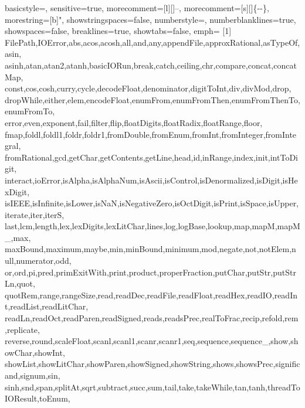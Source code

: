 \renewcommand{\ttdefault}{pcr}
 {
        basicstyle=\itfamily\small,
        sensitive=true,
        morecomment=[l][\ttfamily\tiny]{--},
        morecomment=[s][\ttfamily\tiny]{\{-}{-\}},
        morestring=[b]",
        showstringspaces=false,
        numberstyle=\tiny,
        numberblanklines=true,
        showspaces=false,
        breaklines=true,
        showtabs=false,
        emph=
        {[1]
                        FilePath,IOError,abs,acos,acosh,all,and,any,appendFile,approxRational,asTypeOf,asin,
                asinh,atan,atan2,atanh,basicIORun,break,catch,ceiling,chr,compare,concat,concatMap,
                const,cos,cosh,curry,cycle,decodeFloat,denominator,digitToInt,div,divMod,drop,
                dropWhile,either,elem,encodeFloat,enumFrom,enumFromThen,enumFromThenTo,enumFromTo,
                error,even,exponent,fail,filter,flip,floatDigits,floatRadix,floatRange,floor,
                fmap,foldl,foldl1,foldr,foldr1,fromDouble,fromEnum,fromInt,fromInteger,fromIntegral,
                fromRational,gcd,getChar,getContents,getLine,head,id,inRange,index,init,intToDigit,
                interact,ioError,isAlpha,isAlphaNum,isAscii,isControl,isDenormalized,isDigit,isHexDigit,
                isIEEE,isInfinite,isLower,isNaN,isNegativeZero,isOctDigit,isPrint,isSpace,isUpper,iterate,iter,iterS,
                last,lcm,length,lex,lexDigits,lexLitChar,lines,log,logBase,lookup,map,mapM,mapM_,max,
                maxBound,maximum,maybe,min,minBound,minimum,mod,negate,not,notElem,null,numerator,odd,
                or,ord,pi,pred,primExitWith,print,product,properFraction,putChar,putStr,putStrLn,quot,
                quotRem,range,rangeSize,read,readDec,readFile,readFloat,readHex,readIO,readInt,readList,readLitChar,
                readLn,readOct,readParen,readSigned,reads,readsPrec,realToFrac,recip,refold,rem,replicate,
                reverse,round,scaleFloat,scanl,scanl1,scanr,scanr1,seq,sequence,sequence_,show,showChar,showInt,
                showList,showLitChar,showParen,showSigned,showString,shows,showsPrec,significand,signum,sin,
                sinh,snd,span,splitAt,sqrt,subtract,succ,sum,tail,take,takeWhile,tan,tanh,threadToIOResult,toEnum,
}}
